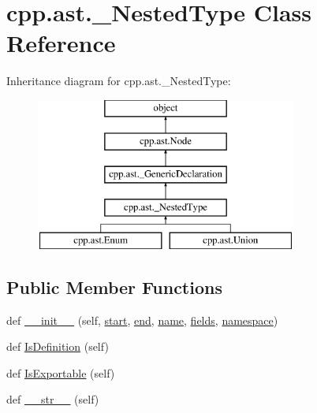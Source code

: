 \hypertarget{classcpp_1_1ast_1_1___nested_type}{}\section{cpp.\+ast.\+\_\+\+Nested\+Type Class Reference}
\label{classcpp_1_1ast_1_1___nested_type}
Inheritance diagram for cpp.\+ast.\+\_\+\+Nested\+Type\+:\begin{figure}[H]
\begin{center}
\leavevmode
\includegraphics[height=5.000000cm]{d9/df9/classcpp_1_1ast_1_1___nested_type}
\end{center}
\end{figure}
\subsection*{Public Member Functions}
\begin{DoxyCompactItemize}
\item 
def \mbox{\hyperlink{classcpp_1_1ast_1_1___nested_type_a63acff60f38885be6cc11231fffc3f4e}{\+\_\+\+\_\+init\+\_\+\+\_\+}} (self, \mbox{\hyperlink{classcpp_1_1ast_1_1_node_a7b2aa97e6a049bb1a93aea48c48f1f44}{start}}, \mbox{\hyperlink{classcpp_1_1ast_1_1_node_a3c5e5246ccf619df28eca02e29d69647}{end}}, \mbox{\hyperlink{classcpp_1_1ast_1_1___generic_declaration_af774f4729dfd78d0538a6782fe8514c1}{name}}, \mbox{\hyperlink{classcpp_1_1ast_1_1___nested_type_aed69c37a409b4d26e6cfde2de3185d86}{fields}}, \mbox{\hyperlink{classcpp_1_1ast_1_1___generic_declaration_a8aee3f11b37449d54b42a78e0a689f46}{namespace}})
\item 
def \mbox{\hyperlink{classcpp_1_1ast_1_1___nested_type_a9f160999863f39c9032f60b014e213d5}{Is\+Definition}} (self)
\item 
def \mbox{\hyperlink{classcpp_1_1ast_1_1___nested_type_a689f8b0dc20e6070938825eee483dd2f}{Is\+Exportable}} (self)
\item 
def \mbox{\hyperlink{classcpp_1_1ast_1_1___nested_type_a18901ec6acba88c526d703444bf4d52c}{\+\_\+\+\_\+str\+\_\+\+\_\+}} (self)
\end{DoxyCompactItemize}
